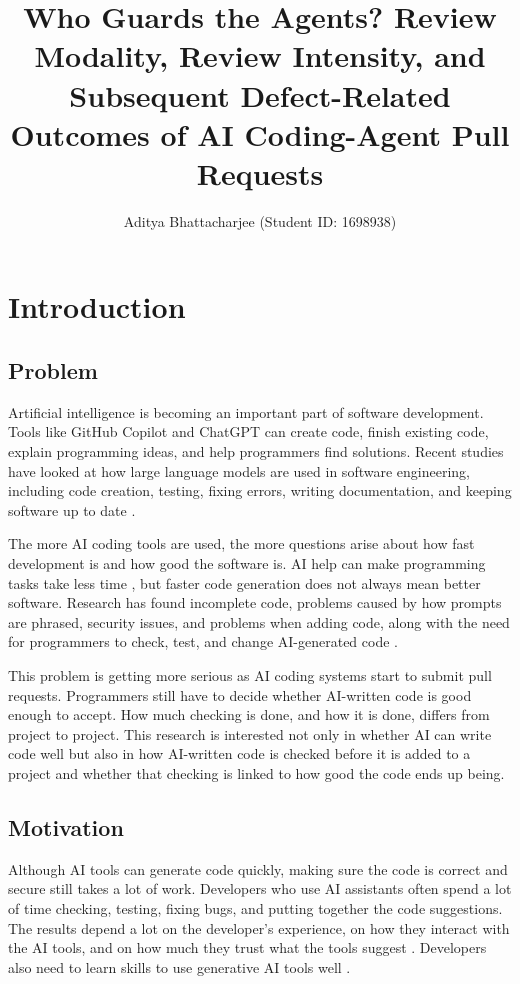 \documentclass[stu,12pt,donotrepeattitle]{apa7}
\title{Who Guards the Agents? Review Modality, Review Intensity, and Subsequent Defect-Related Outcomes of AI Coding-Agent Pull Requests}
\author{Aditya Bhattacharjee (Student ID: 1698938)}
\begin{document}
\maketitle

\newpage

\section{Introduction}

\subsection{Problem}

Artificial intelligence is becoming an important part of software development. Tools like GitHub Copilot and ChatGPT can create code, finish existing code, explain programming ideas, and help programmers find solutions. Recent studies have looked at how large language models are used in software engineering, including code creation, testing, fixing errors, writing documentation, and keeping software up to date \parencite{hou2024}.

The more AI coding tools are used, the more questions arise about how fast development is and how good the software is. AI help can make programming tasks take less time \parencite{paradis2025}, but faster code generation does not always mean better software. Research has found incomplete code, problems caused by how prompts are phrased, security issues, and problems when adding code, along with the need for programmers to check, test, and change AI-generated code \parencite{liu2024,mastropaolo2023,perry2023,zhou2025}.

This problem is getting more serious as AI coding systems start to submit pull requests. Programmers still have to decide whether AI-written code is good enough to accept. How much checking is done, and how it is done, differs from project to project. This research is interested not only in whether AI can write code well but also in how AI-written code is checked before it is added to a project and whether that checking is linked to how good the code ends up being.

\subsection{Motivation}

Although AI tools can generate code quickly, making sure the code is correct and secure still takes a lot of work. Developers who use AI assistants often spend a lot of time checking, testing, fixing bugs, and putting together the code suggestions. The results depend a lot on the developer's experience, on how they interact with the AI tools, and on how much they trust what the tools suggest \parencite{barke2023,moradidakhel2023,perry2023}. Developers also need to learn skills to use generative AI tools well \parencite{france2024}.
\end{document}
